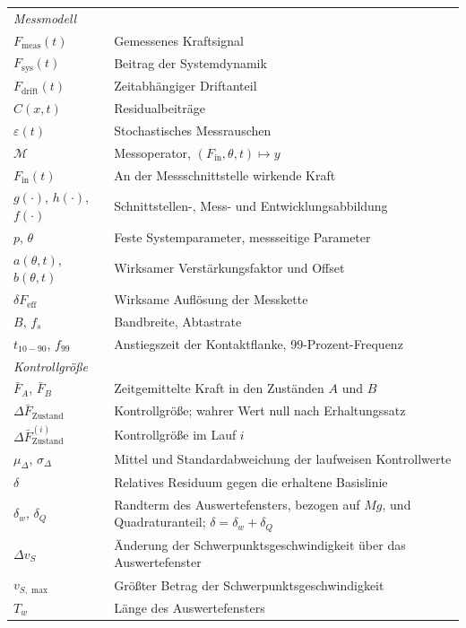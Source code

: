 \documentclass[12pt,a4paper]{report}
\begin{document}
\begin{longtable}{@{}p{}p{}@{}}
\multicolumn{2}{l}{\emph{Messmodell}} \\
$F_{\text{meas}}(t)$ & Gemessenes Kraftsignal \\
$F_{\text{sys}}(t)$ & Beitrag der Systemdynamik \\
$F_{\text{drift}}(t)$ & Zeitabhängiger Driftanteil \\
$C(x,t)$ & Residualbeiträge \\
$\varepsilon(t)$ & Stochastisches Messrauschen \\
$\mathcal{M}$ & Messoperator, $(F_{\text{in}},\theta,t)\mapsto y$ \\
$F_{\text{in}}(t)$ & An der Messschnittstelle wirkende Kraft \\
$g(\cdot)$, $h(\cdot)$, $f(\cdot)$ & Schnittstellen-, Mess- und Entwicklungsabbildung \\
$p$, $\theta$ & Feste Systemparameter, messseitige Parameter \\
$a(\theta,t)$, $b(\theta,t)$ & Wirksamer Verstärkungsfaktor und Offset \\
$\delta F_{\text{eff}}$ & Wirksame Auflösung der Messkette \\
$B$, $f_s$ & Bandbreite, Abtastrate \\
$t_{10-90}$, $f_{99}$ & Anstiegszeit der Kontaktflanke, 99-Prozent-Frequenz \\

\multicolumn{2}{l}{\emph{Kontrollgröße}} \\
$\bar{F}_{A}$, $\bar{F}_{B}$ & Zeitgemittelte Kraft in den Zuständen $A$ und $B$ \\
$\Delta \bar{F}_{\text{Zustand}}$ & Kontrollgröße; wahrer Wert null nach Erhaltungssatz \\
$\Delta \bar{F}^{(i)}_{\text{Zustand}}$ & Kontrollgröße im Lauf $i$ \\
$\mu_{\Delta}$, $\sigma_{\Delta}$ & Mittel und Standardabweichung der laufweisen Kontrollwerte \\
$\delta$ & Relatives Residuum gegen die erhaltene Basislinie \\
$\delta_w$, $\delta_Q$ & Randterm des Auswertefensters, bezogen auf $Mg$, und Quadraturanteil; $\delta = \delta_w + \delta_Q$ \\
$\Delta v_S$ & Änderung der Schwerpunktsgeschwindigkeit über das Auswertefenster \\
$v_{S,\max}$ & Größter Betrag der Schwerpunktsgeschwindigkeit \\
$T_w$ & Länge des Auswertefensters \\


\end{longtable}
\end{document}
